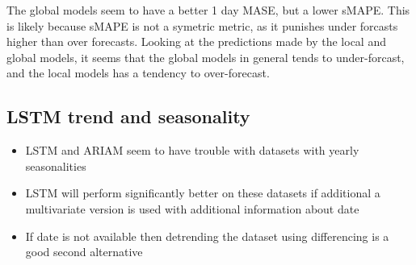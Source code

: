The global models seem to have a better 1 day MASE, but a lower sMAPE.
This is likely because sMAPE is not a symetric metric, as it punishes
under forcasts higher than over forecasts. Looking at the predictions made by
the local and global models, it seems that the global models in general tends to
under-forcast, and the local models has a tendency to over-forecast.

\subsection{LSTM trend and seasonality}
\begin{itemize}
  \item LSTM and ARIAM seem to have trouble with datasets with yearly seasonalities
  \item {LSTM will perform significantly better on these datasets if additional
        a multivariate version is used with additional information about date}
  \item {If date is not available then detrending the dataset using differencing is a good second alternative}
\end{itemize}


